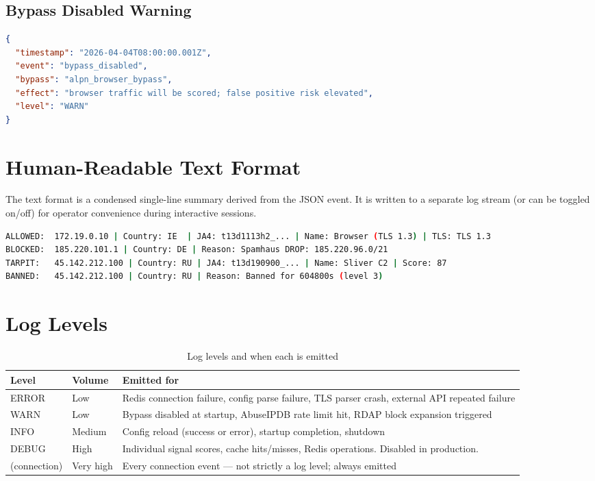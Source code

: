 \subsection{Bypass Disabled Warning}

\begin{lstlisting}[language=json]
{
  "timestamp": "2026-04-04T08:00:00.001Z",
  "event": "bypass_disabled",
  "bypass": "alpn_browser_bypass",
  "effect": "browser traffic will be scored; false positive risk elevated",
  "level": "WARN"
}
\end{lstlisting}

\section{Human-Readable Text Format}

The text format is a condensed single-line summary derived from the JSON event.
It is written to a separate log stream (or can be toggled on/off) for operator
convenience during interactive sessions.

\begin{lstlisting}[language=bash]
ALLOWED:  172.19.0.10 | Country: IE  | JA4: t13d1113h2_... | Name: Browser (TLS 1.3) | TLS: TLS 1.3
BLOCKED:  185.220.101.1 | Country: DE | Reason: Spamhaus DROP: 185.220.96.0/21
TARPIT:   45.142.212.100 | Country: RU | JA4: t13d190900_... | Name: Sliver C2 | Score: 87
BANNED:   45.142.212.100 | Country: RU | Reason: Banned for 604800s (level 3)
\end{lstlisting}

\section{Log Levels}

\begin{fullwidth}
\begin{table}[h]
\caption{Log levels and when each is emitted}
\label{tab:log-levels}
\begin{tabular}{@{}llp{8cm}@{}}
\toprule
\textbf{Level} & \textbf{Volume} & \textbf{Emitted for} \\
\midrule
ERROR & Low & Redis connection failure, config parse failure, TLS parser crash, external API repeated failure \\
WARN & Low & Bypass disabled at startup, AbuseIPDB rate limit hit, RDAP block expansion triggered \\
INFO & Medium & Config reload (success or error), startup completion, shutdown \\
DEBUG & High & Individual signal scores, cache hits/misses, Redis operations. Disabled in production. \\
(connection) & Very high & Every connection event — not strictly a log level; always emitted \\
\bottomrule
\end{tabular}
\end{table}
\end{fullwidth}

